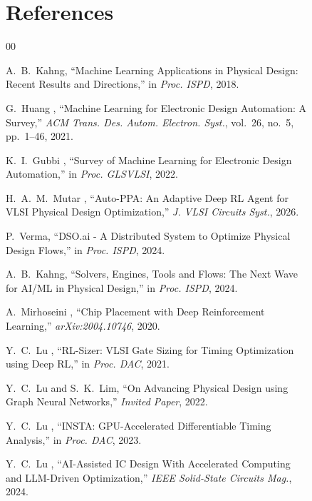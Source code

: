 \documentclass[10pt,conference]{IEEEtran}
\begin{document}
\begin{figure}[t]

\section*{References}

\begin{thebibliography}{00}

A.~B.~Kahng, ``Machine Learning Applications in Physical Design: Recent Results and Directions,'' in \textit{Proc. ISPD}, 2018.

G.~Huang \etal, ``Machine Learning for Electronic Design Automation: A Survey,'' \textit{ACM Trans. Des. Autom. Electron. Syst.}, vol.~26, no.~5, pp.~1--46, 2021.

K.~I.~Gubbi \etal, ``Survey of Machine Learning for Electronic Design Automation,'' in \textit{Proc. GLSVLSI}, 2022.

H.~A.~M.~Mutar \etal, ``Auto-PPA: An Adaptive Deep RL Agent for VLSI Physical Design Optimization,'' \textit{J. VLSI Circuits Syst.}, 2026.

P.~Verma, ``DSO.ai - A Distributed System to Optimize Physical Design Flows,'' in \textit{Proc. ISPD}, 2024.

A.~B.~Kahng, ``Solvers, Engines, Tools and Flows: The Next Wave for AI/ML in Physical Design,'' in \textit{Proc. ISPD}, 2024.

A.~Mirhoseini \etal, ``Chip Placement with Deep Reinforcement Learning,'' \textit{arXiv:2004.10746}, 2020.

Y.~C.~Lu \etal, ``RL-Sizer: VLSI Gate Sizing for Timing Optimization using Deep RL,'' in \textit{Proc. DAC}, 2021.

Y.~C.~Lu and S.~K.~Lim, ``On Advancing Physical Design using Graph Neural Networks,'' \textit{Invited Paper}, 2022.

Y.~C.~Lu \etal, ``INSTA: GPU-Accelerated Differentiable Timing Analysis,'' in \textit{Proc. DAC}, 2023.

Y.~C.~Lu \etal, ``AI-Assisted IC Design With Accelerated Computing and LLM-Driven Optimization,'' \textit{IEEE Solid-State Circuits Mag.}, 2024.


\end{thebibliography}
\end{figure}
\end{document}
